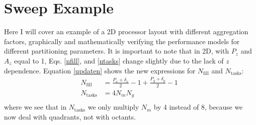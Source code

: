 \documentclass[11pt, letterpaper,titlepage,oneside]{article}
\begin{document}
\newpage

\section*{Sweep Example}

Here I will cover an example of a 2D processor layout with different aggregation factors, graphically and mathematically verifying the performance models for different partitioning parameters. It is important to note that in 2D, with $P_z$ and $A_z$ equal to 1, Eqs. \ref{nfill}, and \ref{ntasks} change slightly due to the lack of $z$ dependence. Equation \ref{updaten} shows the new expressions for $N_{\text{fill}}$ and $N_{\text{tasks}}$:
\begin{align}
N_{\text{fill}} &= \frac{P_x + \delta_x}{2} - 1 + \frac{P_y + \delta_y}{2} - 1 \\
N_{\text{tasks}} &= 4 N_m N_g\\
\label{updaten}
\end{align}
where we see that in $N_{\text{tasks}}$ we only multiply $N_m$ by 4 instead of 8, because we now deal with quadrants, not with octants.

%



\end{document}
